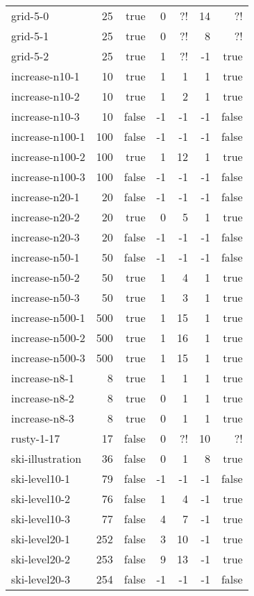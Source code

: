 \documentclass[a4paper]{article}
\begin{document}
\begin{longtable}{lrrrrrr}
	grid-5-0 & 25 & true & 0 & ?! & 14 & ?!\\
	grid-5-1 & 25 & true & 0 & ?! & 8 & ?!\\
	grid-5-2 & 25 & true & 1 & ?! & -1 & true\\
	increase-n10-1 & 10 & true & 1 & 1 & 1 & true\\
	increase-n10-2 & 10 & true & 1 & 2 & 1 & true\\
	increase-n10-3 & 10 & false & -1 & -1 & -1 & false\\
	increase-n100-1 & 100 & false & -1 & -1 & -1 & false\\
	increase-n100-2 & 100 & true & 1 & 12 & 1 & true\\
	increase-n100-3 & 100 & false & -1 & -1 & -1 & false\\
	increase-n20-1 & 20 & false & -1 & -1 & -1 & false\\
	increase-n20-2 & 20 & true & 0 & 5 & 1 & true\\
	increase-n20-3 & 20 & false & -1 & -1 & -1 & false\\
	increase-n50-1 & 50 & false & -1 & -1 & -1 & false\\
	increase-n50-2 & 50 & true & 1 & 4 & 1 & true\\
	increase-n50-3 & 50 & true & 1 & 3 & 1 & true\\
	increase-n500-1 & 500 & true & 1 & 15 & 1 & true\\
	increase-n500-2 & 500 & true & 1 & 16 & 1 & true\\
	increase-n500-3 & 500 & true & 1 & 15 & 1 & true\\
	increase-n8-1 & 8 & true & 1 & 1 & 1 & true\\
	increase-n8-2 & 8 & true & 0 & 1 & 1 & true\\
	increase-n8-3 & 8 & true & 0 & 1 & 1 & true\\
	rusty-1-17 & 17 & false & 0 & ?! & 10 & ?!\\
	ski-illustration & 36 & false & 0 & 1 & 8 & true\\
	ski-level10-1 & 79 & false & -1 & -1 & -1 & false\\
	ski-level10-2 & 76 & false & 1 & 4 & -1 & true\\
	ski-level10-3 & 77 & false & 4 & 7 & -1 & true\\
	ski-level20-1 & 252 & false & 3 & 10 & -1 & true\\
	ski-level20-2 & 253 & false & 9 & 13 & -1 & true\\
	ski-level20-3 & 254 & false & -1 & -1 & -1 & false\\

\end{longtable}
\end{document}

